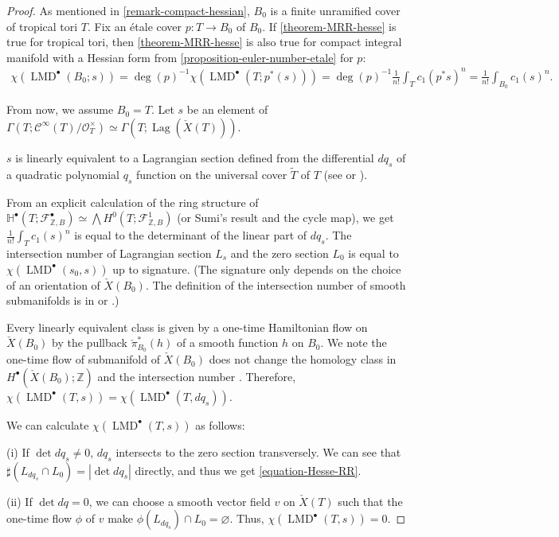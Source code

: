 \documentclass[a4paper,dvipdfmx,reqno,12pt]{amsart}
\theoremstyle{definition}
\newcommand{\emp}{\varnothing}%
\newcommand{\Z}{\mathbb{Z}}%
\newcommand{\mcal}[1]{\mathcal{#1}}%
\newcommand{\opn}[1]{\operatorname{#1}}
\numberwithin{equation}{section}
\begin{document}
\begin{proof}

As mentioned in \cref{remark-compact-hessian},
$B_0$ is a finite unramified cover of tropical tori $T$.
Fix an \'etale cover $p:T \to B_0$ of $B_0$.
If \cref{theorem-MRR-hesse} is true for tropical tori,
then \cref{theorem-MRR-hesse} is also true for compact
integral manifold with a Hessian form from
\cref{proposition-euler-number-etale} for $p$:
\begin{align}
\chi(\opn{LMD}^{\bullet}(B_0;s))
=\opn{deg}(p)^{-1}\chi(\opn{LMD}^{\bullet}(T;p^{*}(s)))
=\opn{deg}(p)^{-1}\frac{1}{n!}\int_T c_1(p^{*}s)^{n}
=\frac{1}{n!}\int_{B_0}c_1(s)^{n}.
\end{align}

From now, we assume $B_0=T$.
Let $s$ be an element of 
$\Gamma(T;\mcal{C}^{\infty}(T)/\mcal{O}_{T}^{\times})\simeq
\Gamma(T;\opn{Lag}(\check{X}(T)))$.

$s$ is linearly equivalent to a Lagrangian section
defined from the differential $dq_s$ of a quadratic polynomial
$q_s$ function on the universal cover $\tilde{T}$ of $T$
(see \cite{mikhalkinTropicalCurvesTheir2008a} or 
\cite[3.3]{MR4229604}).

From an explicit calculation of the ring structure of
$\mathbb{H}^{\bullet}(T;\mathcal{F}_{\mathbb{Z},B}^{\bullet})
\simeq \bigwedge H^{0}(T;\mathcal{F}_{\mathbb{Z},B}^{1})$
(or Sumi's result
\cite[Theorem 47]{MR4229604} and the cycle map), 
we get 
$\frac{1}{n!}\int_{T}c_1(s)^{n}$ is equal to the determinant
of the linear part of $dq_s$. 
The intersection number of Lagrangian
section $L_s$ and the zero section $L_0$ is equal to
$\chi(\opn{LMD}^{\bullet}(s_0,s))$ up to 
signature.
(The signature only depends on
the choice of 
an orientation of $\check{X}(B_0)$. 
The definition of the intersection number of smooth 
submanifolds is in \cite[5.2]{MR1336822} or 
\cite[0.4]{griffithsPrinciplesAlgebraicGeometry1994a}.)

Every linearly equivalent 
class is given by a one-time Hamiltonian flow on 
$\check{X}(B_0)$ by the pullback $\check{\pi}_{B_0}^{*}(h)$
of a smooth function $h$ on $B_0$.
We note the one-time flow of submanifold of $\check{X}(B_0)$ does not change
the homology class in $H^{\bullet}(\check{X}(B_0);\Z)$ and
the intersection number \cite[5.2.1. Theorem]{MR1336822}.
Therefore, 
$\chi(\opn{LMD}^{\bullet}(T,s))=
\chi(\opn{LMD}^{\bullet}(T,dq_{s}))$.

We can calculate $\chi(\opn{LMD}^{\bullet}(T,s))$ as follows:

(i) If $\det dq_s\ne 0$, $dq_s$ intersects to 
the zero section transversely. We can see that 
$\sharp(L_{dq_s}\cap L_0)=|\det dq_s|$ directly, and thus
we get \cref{equation-Hesse-RR}. 

(ii) If $\det dq=0$, we can choose a smooth vector field
 $v$ on $\check{X}(T)$ such that the one-time flow 
$\phi$ of $v$ make 
$\phi(L_{dq_s})\cap L_0=\emp$. 
Thus, $\chi(\opn{LMD}^{\bullet}(T,s))=0$.
\end{proof}
\end{document}
